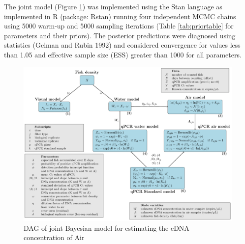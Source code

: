 \documentclass{article}
\begin{document}
The joint model (Figure \ref{fig:DAG}) was implemented using the Stan language as implemented in R (package: Rstan) running four independent MCMC chains using 5000 warm-up and 5000 sampling iterations (Table \ref{tab:priortable} for parameters and their priors). The posterior predictions were diagnosed using statistics (Gelman and Rubin 1992) and considered convergence for values less than 1.05 and effective sample size (ESS) greater than 1000 for all parameters.

\begin{figure}[tbhp] 
\centering
\includegraphics[width=16.5cm]{Plots/DAG.pdf}  
\caption{DAG of joint Bayesian model for estimating the eDNA concentration of Air}
\label{fig:DAG}
\end{figure}
\end{document}
